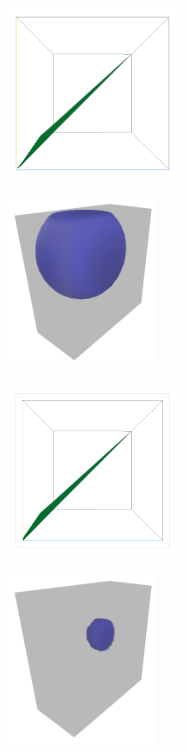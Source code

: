 \documentclass[a4paper,fontsize=12pt,toc=bib,parskip=half,ngerman]{scrartcl}
\begin{document}
\begin{figure}
	\begin{subfigure}{0.49\textwidth}
		\centering
		\includegraphics[height=4.5cm]{pictures/results/SinglePoint/SinglePoint_InvariantSpace1.png}
		\subcaption{}
		\label{SinglePointInvariant1}
	\end{subfigure}
	\hspace*{\fill}
	\begin{subfigure}{0.49\textwidth}
		\centering
		\includegraphics[height=4.5cm]{pictures/results/SinglePoint/SinglePoint_Object1.png}
		\subcaption{}
		\label{SinglePointObject1}
	\end{subfigure}
	\medskip
	\begin{subfigure}{0.49\textwidth}
		\centering
		\includegraphics[height=4.5cm]{pictures/results/SinglePoint/SinglePoint_InvariantSpace2.png}
		\subcaption{}
		\label{SinglePointInvariant2}
	\end{subfigure}
	\hspace*{\fill}
	\begin{subfigure}{0.49\textwidth}
		\centering
		\includegraphics[height=4.5cm]{pictures/results/SinglePoint/SinglePoint_Object2.png}

\end{subfigure}
\end{figure}
\end{document}
